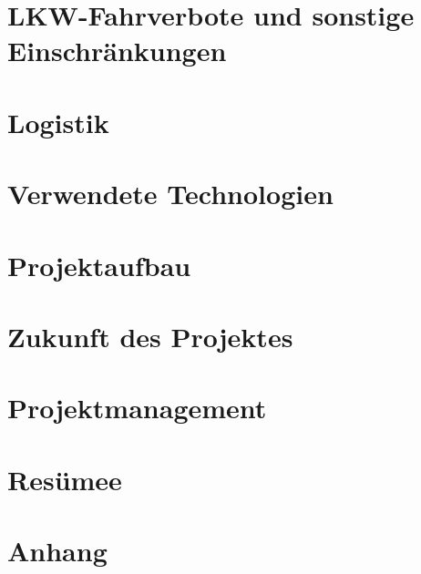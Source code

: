 \documentclass[12pt]{report}
\begin{document}
    \chapter{LKW-Fahrverbote und sonstige Einschränkungen}
    

    \chapter{Logistik}
    

    \chapter{Verwendete Technologien}
    

    \chapter{Projektaufbau}
    

    \chapter{Zukunft des Projektes}
    

    \chapter{Projektmanagement}
    

    \chapter{Resümee}
    

    \chapter{Anhang}
    
    
\end{document}
